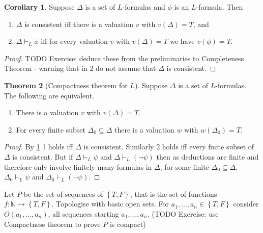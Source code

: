 \documentclass{article}
\newcommand{\N}{\mathbb{N}}
\newcommand{\rb}[1]{\left( #1 \right)}
\newcommand{\cb}[1]{\left\{ #1 \right\}}
\newcommand{\notb}[1]{\rb{\neg #1}}
\theoremstyle{definition}\newtheorem{definition}{Definition}[subsection]
\theoremstyle{definition}\newtheorem{remark}[definition]{Remark}
\theoremstyle{definition}\newtheorem*{example}{Example}
\theoremstyle{definition}\newtheorem*{note}{Note}
\newtheorem{theorem}[definition]{Theorem}
\newtheorem{corollary}[definition]{Corollary}
\begin{document}
\begin{corollary}
\label{cor:1.3.12}
Suppose $ \Delta $ is a set of $ L $-formulas and $ \phi $ is an $ L $-formula. Then
\begin{enumerate}
\item $ \Delta $ is consistent iff there is a valuation $ v $ with $ v\rb{\Delta} = T $, and
\item $ \Delta \vdash_L \phi $ iff for every valuation $ v $ with $ v\rb{\Delta} = T $ we have $ v\rb{\phi} = T $.
\end{enumerate}
\end{corollary}

\begin{proof}
TODO Exercise: deduce these from the preliminaries to Completeness Theorem - warning that in 2 do not assume that $ \Delta $ is consistent.
\end{proof}

\begin{theorem}[Compactness theorem for $ L $]
Suppose $ \Delta $ is a set of $ L $-formulas. The following are equivalent.
\begin{enumerate}
\item There is a valuation $ v $ with $ v\rb{\Delta} = T $.
\item For every finite subset $ \Delta_0 \subseteq \Delta $ there is a valuation $ w $ with $ w\rb{\Delta_0} = T $.
\end{enumerate}
\end{theorem}

\begin{proof}
By \ref{cor:1.3.12} 1 holds iff $ \Delta $ is consistent. Similarly 2 holds iff every finite subset of $ \Delta $ is consistent. But if $ \Delta \vdash_L \psi $ and $ \Delta \vdash_L \notb{\psi} $ then as deductions are finite and therefore only involve finitely many formulas in $ \Delta $, for some finite $ \Delta_0 \subseteq \Delta $, $ \Delta_0 \vdash_L \psi $ and $ \Delta_0 \vdash_L \notb{\psi} $.
\end{proof}

Let $ P $ be the set of sequences of $ \cb{T, F} $, that is the set of functions $ f : \N \to \cb{T, F} $. Topologise with basic open sets. For $ a_1, \dots, a_n \in \cb{T, F} $ consider $ O\rb{a_1, \dots, a_n} $, all sequences starting $ a_1, \dots, a_n $. (TODO Exercise: use Compactness theorem to prove $ P $ is compact)

\end{document}
